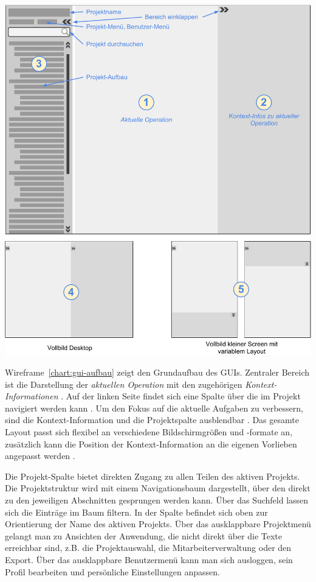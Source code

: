 \begin{center}
\includegraphics[width=\textwidth]{media/GUIAufbau.pdf}
\label{chart:gui-aufbau}
\end{center}

Wireframe~\ref{chart:gui-aufbau} zeigt den Grundaufbau des GUIs. Zentraler Bereich ist die Darstellung der \emph{aktuellen Operation}  mit den zugehörigen \emph{Kontext-Informationen} . Auf der linken Seite findet sich eine Spalte über die im Projekt navigiert werden kann . Um den Fokus auf die aktuelle Aufgaben zu verbessern, sind die Kontext-Information und die Projektspalte ausblendbar . Das gesamte Layout passt sich flexibel an verschiedene Bildschirmgrößen und -formate an, zusätzlich kann die Position der Kontext-Information an die eigenen Vorlieben angepasst werden .

Die Projekt-Spalte  bietet direkten Zugang zu allen Teilen des aktiven Projekts. Die Projektstruktur wird mit einem Navigationsbaum dargestellt, über den direkt zu den jeweiligen Abschnitten gesprungen werden kann. Über das Suchfeld lassen sich die Einträge im Baum filtern. In der Spalte befindet sich oben zur Orientierung der Name des aktiven Projekts. Über das ausklappbare Projektmenü gelangt man zu Ansichten der Anwendung, die nicht direkt über die Texte erreichbar sind, z.B. die Projektauswahl, die Mitarbeiterverwaltung oder den Export. Über das ausklappbare Benutzermenü kann man sich ausloggen, sein Profil bearbeiten und persönliche Einstellungen anpassen.


